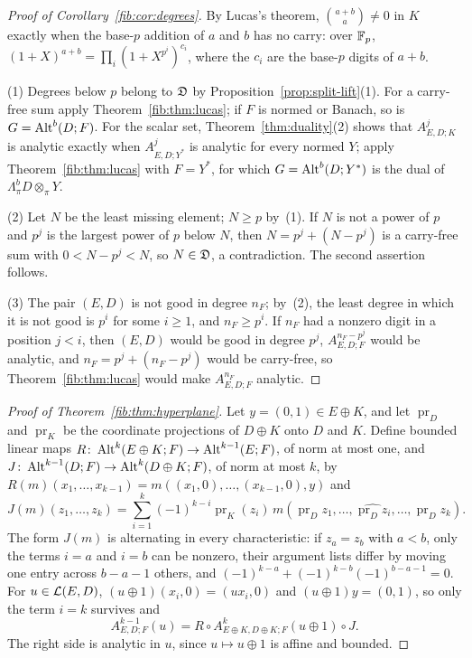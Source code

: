 \begin{proof}[Proof of Corollary~\ref{fib:cor:degrees}]
By Lucas's theorem, $\binom{a+b}a\ne0$ in $K$ exactly when the base-$p$ addition of $a$ and $b$ has no carry: over
$\mathbb F_p$, $(1+X)^{a+b}=\prod_i(1+X^{p^i})^{c_i}$, where the $c_i$ are the base-$p$ digits of $a+b$.

(1) Degrees below $p$ belong to $\mathfrak D$ by Proposition~\ref{prop:split-lift}(1). For a carry-free sum apply
Theorem~\ref{fib:thm:lucas}; if $F$ is normed or Banach, so is $G=\operatorname{Alt}^b(D;F)$. For the scalar set,
Theorem~\ref{thm:duality}(2) shows that $A^j_{E,D;K}$ is analytic exactly when $A^j_{E,D;Y^*}$ is analytic for every
normed $Y$; apply Theorem~\ref{fib:thm:lucas} with $F=Y^*$, for which $G=\operatorname{Alt}^b(D;Y^*)$ is the dual of
$\Lambda^b_\pi D\otimes_\pi Y$.

(2) Let $N$ be the least missing element; $N\ge p$ by~(1). If $N$ is not a power of $p$ and $p^j$ is the largest power
of $p$ below $N$, then $N=p^j+(N-p^j)$ is a carry-free sum with $0<N-p^j<N$, so $N\in\mathfrak D$, a contradiction. The second
assertion follows.

(3) The pair $(E,D)$ is not good in degree $n_F$; by~(2), the least degree in which it is not good is $p^i$ for some
$i\ge1$, and $n_F\ge p^i$. If $n_F$ had a nonzero digit in a position $j<i$, then $(E,D)$ would be good in degree $p^j$,
$A^{n_F-p^j}_{E,D;F}$ would be analytic, and $n_F=p^j+(n_F-p^j)$ would be carry-free, so
Theorem~\ref{fib:thm:lucas} would make $A^{n_F}_{E,D;F}$ analytic.
\end{proof}

\begin{proof}[Proof of Theorem~\ref{fib:thm:hyperplane}]
Let $y=(0,1)\in E\oplus K$, and let $\operatorname{pr}_D$ and $\operatorname{pr}_K$ be the coordinate projections of
$D\oplus K$ onto $D$ and $K$. Define bounded linear maps $R\colon\operatorname{Alt}^k(E\oplus K;F)\to\operatorname{Alt}^{k-1}(E;F)$, of norm at most
one, and $J\colon\operatorname{Alt}^{k-1}(D;F)\to\operatorname{Alt}^k(D\oplus K;F)$, of norm at most $k$, by
$R(m)(x_1,\dots,x_{k-1})=m((x_1,0),\dots,(x_{k-1},0),y)$ and
\[
 J(m)(z_1,\dots,z_k)=\sum_{i=1}^k(-1)^{k-i}\operatorname{pr}_K(z_i)\,
 m(\operatorname{pr}_Dz_1,\dots,\widehat{\operatorname{pr}_Dz_i},\dots,\operatorname{pr}_Dz_k).
\]
The form $J(m)$ is alternating in every characteristic: if $z_a=z_b$ with $a<b$, only the terms $i=a$ and $i=b$ can be
nonzero, their argument lists differ by moving one entry across $b-a-1$ others, and
$(-1)^{k-a}+(-1)^{k-b}(-1)^{b-a-1}=0$. For $u\in\mathcal L(E,D)$, $(u\oplus1)(x_i,0)=(ux_i,0)$ and $(u\oplus1)y=(0,1)$, so only
the term $i=k$ survives and
\[
 A^{k-1}_{E,D;F}(u)=R\circ A^k_{E\oplus K,D\oplus K;F}(u\oplus1)\circ J.
\]
The right side is analytic in $u$, since $u\mapsto u\oplus1$ is affine and bounded.
\end{proof}

